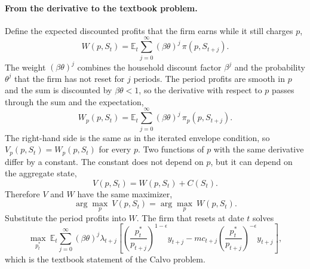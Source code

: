 \documentclass[11pt]{article}
\begin{document}
\paragraph{From the derivative to the textbook problem.} Define the expected discounted profits that the firm earns while it still charges $p$,
\begin{equation*}
W(p, S_t) = \mathbb{E}_t \sum_{j=0}^{\infty} (\beta\theta)^{j}\, \pi(p, S_{t+j}) .
\end{equation*}
The weight $(\beta\theta)^j$ combines the household discount factor $\beta^j$ and the probability $\theta^j$ that the firm has not reset for $j$ periods. The period profits are smooth in $p$ and the sum is discounted by $\beta\theta < 1$, so the derivative with respect to $p$ passes through the sum and the expectation,
\begin{equation*}
W_p(p, S_t) = \mathbb{E}_t \sum_{j=0}^{\infty} (\beta\theta)^{j}\, \pi_p(p, S_{t+j}) .
\end{equation*}
The right-hand side is the same as in the iterated envelope condition, so $V_p(p, S_t) = W_p(p, S_t)$ for every $p$. Two functions of $p$ with the same derivative differ by a constant. The constant does not depend on $p$, but it can depend on the aggregate state,
\begin{equation*}
V(p, S_t) = W(p, S_t) + C(S_t) .
\end{equation*}
Therefore $V$ and $W$ have the same maximizer,
\begin{equation*}
\arg\max_{p} \ V(p, S_t) = \arg\max_{p} \ W(p, S_t) .
\end{equation*}
Substitute the period profits into $W$. The firm that resets at date $t$ solves
\begin{equation*}
\max_{p_t^{*}} \ \mathbb{E}_t \sum_{j=0}^{\infty} (\beta\theta)^{j} \lambda_{t+j} \left[ \left( \frac{p_t^{*}}{p_{t+j}} \right)^{1-\epsilon} y_{t+j} - mc_{t+j} \left( \frac{p_t^{*}}{p_{t+j}} \right)^{-\epsilon} y_{t+j} \right] ,
\end{equation*}
which is the textbook statement of the Calvo problem.
\end{document}
